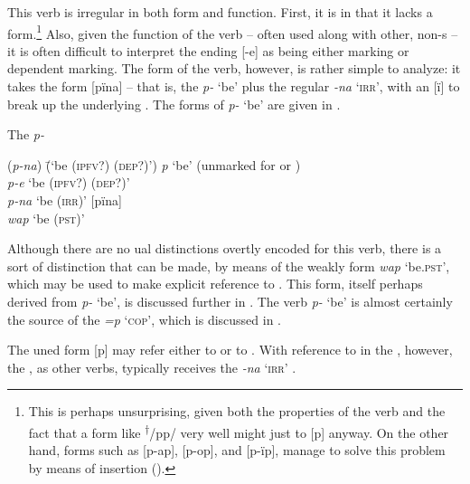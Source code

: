 This verb is irregular in both form and function. First, it is  in that it lacks a  form.\footnote{This is perhaps unsurprising, given both the  properties of the verb and the fact that a  form like \textsuperscript{†}/pp/ very well might just  to [p] anyway. On the other hand,  forms such as [p-ap], [p-op], and [p-ïp], manage to solve this problem by means of  insertion ().} Also, given the function of the verb -- often used along with other, non-s -- it is often difficult to interpret the ending [-e] as being either  marking or  dependent marking. The  form of the verb, however, is rather simple to analyze: it takes the form [pïna] -- that is, the  \textit{p-} ‘be’ plus the regular   \textit{-na} ‘\textsc{irr}’, with an  [ï] to break up the underlying . The forms of \textit{p-} ‘be’ are given in .

\ea%
    \label{ex:pred:2a}
The  \textit{p-} \\
\begin{tabbing}
{(\textit{p-na})} \= {(‘be (\textsc{ipfv}?) (\textsc{dep}?)’)}\kill
{\textit{p}} \> {‘be’} (unmarked for  or )\\
{\textit{p-e}} \> {‘be (\textsc{ipfv}?) (\textsc{dep}?)’}\\
{\textit{p-na}} \> {‘be (\textsc{irr})’ [pïna]}\\
{\textit{wap}} \> {‘be (\textsc{pst})’}
\end{tabbing}
\z

  Although there are no ual distinctions overtly encoded for this verb, there is a sort of  distinction that can be made, by means of the weakly  form \textit{wap} ‘be.\textsc{pst}’, which may be used to make explicit reference to  . This form, itself perhaps derived from \textit{p-} ‘be’, is discussed further in . The verb \textit{p-} ‘be’ is almost certainly the source of the  \textit{=p} ‘\textsc{cop}’, which is discussed in .
  
 The uned form [p] may refer either to   or to  . With reference to  in the , however, the , as other verbs, typically receives the   \textit{-na} ‘\textsc{irr}’ .

